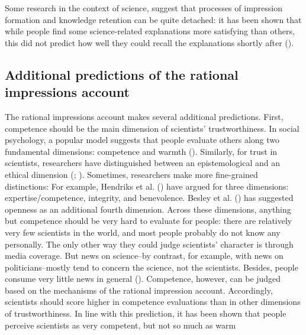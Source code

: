 \documentclass[
  jou,
  floatsintext,
  longtable,
  nolmodern,
  notxfonts,
  notimes,
  colorlinks=true,linkcolor=blue,citecolor=blue,urlcolor=blue]{apa7}
\begin{document}
Some research in the context of science, suggest that processes of
impression formation and knowledge retention can be quite detached: it
has been shown that while people find some science-related explanations
more satisfying than others, this did not predict how well they could
recall the explanations shortly after
().

\subsection{Additional predictions of the rational impressions
account}\label{additional-predictions-of-the-rational-impressions-account}

The rational impressions account makes several additional predictions.
First, competence should be the main dimension of scientists'
trustworthiness. In social psychology, a popular model suggests that
people evaluate others along two fundamental dimensions: competence and
warmth (). Similarly, for trust in scientists, researchers have
distinguished between an epistemological and an ethical dimension
(;
).
Sometimes, researchers make more fine-grained distinctions: For example,
Hendriks et al.
() have argued
for three dimensions: expertise/competence, integrity, and benevolence.
Besley et al. ()
has suggested openness as an additional fourth dimension. Across these
dimensions, anything but competence should be very hard to evaluate for
people: there are relatively very few scientists in the world, and most
people probably do not know any personally. The only other way they
could judge scientists' character is through media coverage. But news on
science--by contrast, for example, with news on politicians--mostly tend
to concern the science, not the scientists. Besides, people consume very
little news in general
().
Competence, however, can be judged based on the mechanisms of the
rational impression account. Accordingly, scientists should score higher
in competence evaluations than in other dimensions of trustworthiness.
In line with this prediction, it has been shown that people perceive
scientists as very competent, but not so much as warm
\end{document}
